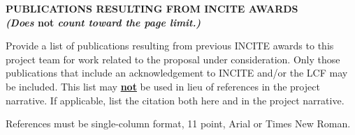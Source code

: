 \documentclass[11pt,letterpaper,english]{article}
\begin{document}
\setlength{\parindent}{0in} %


\pagestyle{fancy}   \renewcommand{%
\headrulewidth}{0.0pt}

\begin{center}
\bf {PUBLICATIONS RESULTING FROM INCITE AWARDS} \\
{\bf {\em (Does} not {\em count toward the page limit.)}}
\end{center}
\vspace{-.25in}
Provide a list of publications resulting from previous INCITE awards to this project team for work related to the proposal under consideration. Only those publications that include an acknowledgement to INCITE and/or the LCF may be included. This list may {\bf \underline {not}} be used in lieu of references in the project narrative. If applicable, list the citation both here and in the project narrative.

References must be single-column format, 11 point, Arial or Times New Roman.


\end{document}
